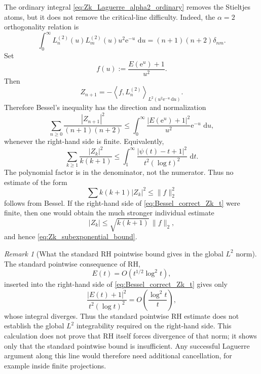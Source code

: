 \documentclass[11pt]{amsart}
\numberwithin{equation}{section}
\theoremstyle{plain}
\theoremstyle{definition}
\theoremstyle{remark}
\newtheorem{remark}[theorem]{Remark}
\newcommand{\RH}{\mathrm{RH}}
\newcommand{\e}{\mathrm e}
\newcommand{\dd}{\,\mathrm d}
\begin{document}
The ordinary integral \eqref{eq:Zk_Laguerre_alpha2_ordinary} removes the Stieltjes atoms, but it does not remove the critical-line difficulty.  Indeed, the $\alpha=2$ orthogonality relation is
\begin{equation}
 \int_0^\infty
 L_n^{(2)}(u)L_m^{(2)}(u)u^2\e^{-u}\,\dd u
 =(n+1)(n+2)\delta_{nm}.
 \label{eq:Laguerre_alpha2_orthogonality}
\end{equation}
Set
\begin{equation}
 f(u):=\frac{E(\e^u)+1}{u^2}.
 \label{eq:f_alpha2_definition}
\end{equation}
Then
\begin{equation}
 Z_{n+1}
 =-\left\langle f,L_n^{(2)}\right\rangle_{L^2(u^2\e^{-u}\dd u)}.
\end{equation}
Therefore Bessel's inequality has the direction and normalization
\begin{equation}
 \boxed{
 \sum_{n\ge0}
 \frac{|Z_{n+1}|^2}{(n+1)(n+2)}
 \le
 \int_0^\infty
 \frac{|E(\e^u)+1|^2}{u^2}\e^{-u}\,\dd u,}
 \label{eq:Bessel_correct_Zk}
\end{equation}
whenever the right-hand side is finite.  Equivalently,
\begin{equation}
 \boxed{
 \sum_{k\ge1}\frac{|Z_k|^2}{k(k+1)}
 \le
 \int_1^\infty
 \frac{|\psi(t)-t+1|^2}{t^2(\log t)^2}\,\dd t.}
 \label{eq:Bessel_correct_Zk_t}
\end{equation}
The polynomial factor is in the denominator, not the numerator.  Thus no estimate of the form
\begin{equation}
 \sum k(k+1)|Z_k|^2\le \|f\|_2^2
\end{equation}
follows from Bessel.  If the right-hand side of \eqref{eq:Bessel_correct_Zk_t} were finite, then one would obtain the much stronger individual estimate
\begin{equation}
 |Z_k|\le \sqrt{k(k+1)}\,\|f\|_2,
 \label{eq:Zk_polynomial_from_global_L2}
\end{equation}
and hence \eqref{eq:Zk_subexponential_bound}.

\begin{remark}[What the standard RH pointwise bound gives in the global $L^2$ norm]
\label{rem:global_L2_standard_RH_bound}
The standard pointwise consequence of $\RH$,
\begin{equation}
 E(t)=O(t^{1/2}\log^2 t),
\end{equation}
inserted into the right-hand side of \eqref{eq:Bessel_correct_Zk_t} gives only
\begin{equation}
 \frac{|E(t)+1|^2}{t^2(\log t)^2}
 =O\!\left(\frac{\log^2 t}{t}\right),
\end{equation}
whose integral diverges.  Thus the standard pointwise RH estimate does not establish the global $L^2$ integrability required on the right-hand side.  This calculation does not prove that RH itself forces divergence of that norm; it shows only that the standard pointwise bound is insufficient.  Any successful Laguerre argument along this line would therefore need additional cancellation, for example inside finite projections.
\end{remark}
\end{document}
